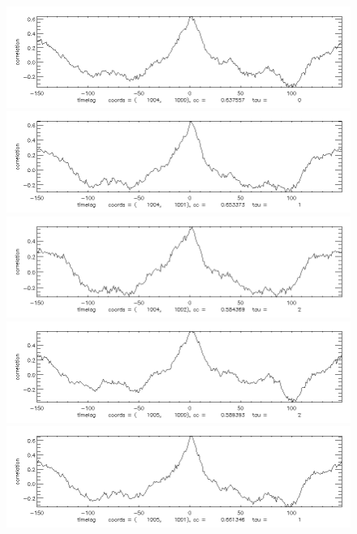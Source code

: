 \documentclass[12pt]{article}
\begin{document}
\begin{figure}[here]
\includegraphics[width=7in]{cc31.png}
\includegraphics[width=7in]{cc32.png}
\includegraphics[width=7in]{cc33.png}
\includegraphics[width=7in]{cc34.png}
\includegraphics[width=7in]{cc35.png}
\end{figure}
\newpage
\end{document}
